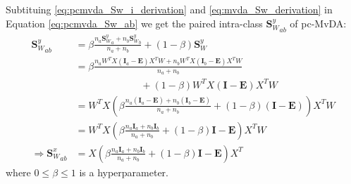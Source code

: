 \begin{appendix}
    Subtituing \eqref{eq:pcmvda_Sw_i_derivation} and \eqref{eq:mvda_Sw_derivation} in Equation \eqref{eq:pcmvda_Sw_ab} we get the paired intra-class ${\boldsymbol{S}_W^y}_{ab}$ of pc-MvDA:
    \begin{equation}
        \begin{split}
            {\boldsymbol{S}_W^y}_{ab} &= \beta\frac{n_a{\boldsymbol{S}_W^y}_a + n_b{\boldsymbol{S}_W^y}_b}{n_a + n_b} + (1 - \beta)\boldsymbol{S}_W^y \\
            &= \beta\frac{n_a W^T X \left(\boldsymbol{I}_a - \boldsymbol{E}\right) X^T W + n_b W^T X \left(\boldsymbol{I}_b - \boldsymbol{E}\right) X^T W}{n_a + n_b} \\
            &\ \ \ \ \ \ \ \ \ \ \ \ \ \ \ \ \ \ \ \ \ \ \ \ \ \ \ \ \ \ + (1 - \beta)W^T X \left(\boldsymbol{I} - \boldsymbol{E}\right) X^T W \\
            &= W^T X \left(\beta\frac{n_a\left(\boldsymbol{I}_a - \boldsymbol{E}\right) + n_b\left(\boldsymbol{I}_b - \boldsymbol{E}\right)}{n_a + n_b} + (1 - \beta)\left(\boldsymbol{I} - \boldsymbol{E}\right)\right) X^T W \\
            &= W^T X \left(\beta\frac{n_a\boldsymbol{I}_a + n_b\boldsymbol{I}_b}{n_a + n_b} + (1 - \beta)\boldsymbol{I} - \boldsymbol{E}\right) X^T W \\
           \Rightarrow {\boldsymbol{S}_W^x}_{ab} &= X \left(\beta\frac{n_a\boldsymbol{I}_a + n_b\boldsymbol{I}_b}{n_a + n_b} + (1 - \beta)\boldsymbol{I} - \boldsymbol{E}\right) X^T
        \end{split}
        \label{eq:pcmvda_Sw_ab_derivation}
    \end{equation}
    where $0 \leq \beta \leq 1$ is a hyperparameter.


\end{appendix}
